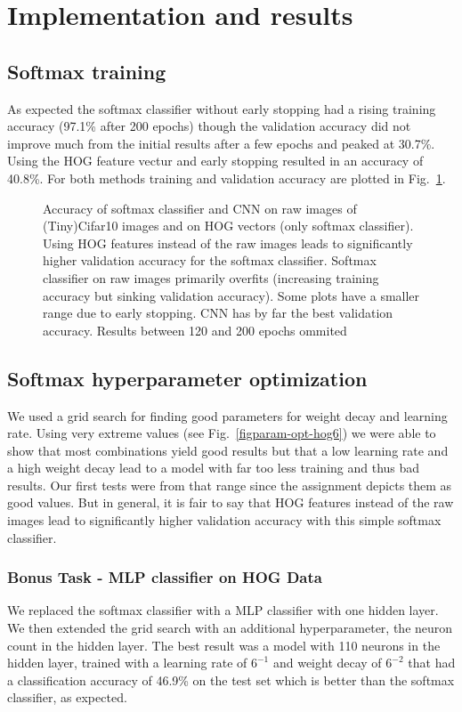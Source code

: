 \section{Implementation and results}

\subsection{Softmax training}
As expected the softmax classifier without early stopping had a rising training accuracy (97.1\% after 200 epochs) though the validation accuracy did not improve much from the initial results after a few epochs and peaked at 30.7\%. Using the HOG feature vectur and early stopping resulted in an accuracy of 40.8\%. For both methods training and validation accuracy are plotted in Fig.~\ref{fig:accuracy}.
\begin{figure}[h!t]
\newcommand{\plotref}[1]{{[~\ref{plt:#1}~]}}
\centering
\caption{Accuracy of softmax classifier and CNN on raw images of (Tiny)Cifar10 images and on HOG vectors (only softmax classifier). Using HOG features instead of the raw images leads to significantly higher validation accuracy for the softmax classifier. Softmax classifier on raw images primarily overfits (increasing training accuracy but sinking validation accuracy). Some plots have a smaller range due to early stopping. CNN has by far the best validation accuracy. Results between 120 and 200 epochs ommited} %
\label{fig:accuracy}
\end{figure}


\subsection{Softmax hyperparameter optimization}
We used a grid search for finding good parameters for weight decay and learning rate. Using very extreme values (see Fig.~\ref{figparam-opt-hog6}) we were able to show that most combinations yield good results but that a low learning rate and a high weight decay lead to a model with far too less training and thus bad results. Our first tests were from that range since the assignment depicts them as good values. But in general, it is fair to say that HOG features instead of the raw images lead to significantly higher validation accuracy with this simple softmax classifier.

\subsubsection{Bonus Task - MLP classifier on HOG Data}
We replaced the softmax classifier with a MLP classifier with one hidden layer. We then extended the grid search with an additional hyperparameter, the neuron count in the hidden layer. The best result was a model with 110 neurons in the hidden layer, trained with a learning rate of $6^{-1}$ and weight decay of $6^{-2}$ that had a classification accuracy of 46.9\% on the test set which is better than the softmax classifier, as expected.


